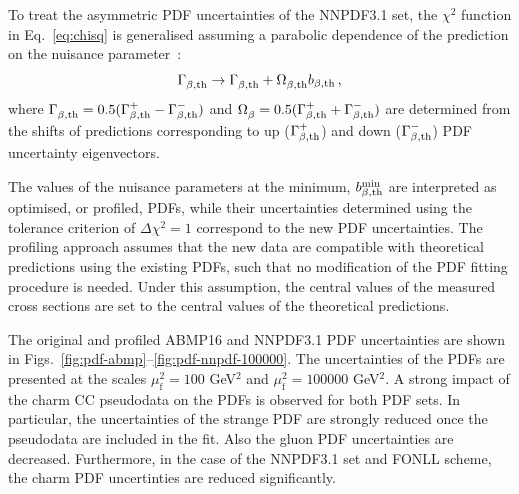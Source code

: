 \documentclass[pdftex,twocolumn,epjc3]{svjour3}          %
\newcommand{\abmp} {ABMP16\xspace}
\newcommand{\nnpdf} {NNPDF3.1\xspace}
\newcommand{\chisq}{\ensuremath{\chi^2}\xspace}
\begin{document}
To treat the asymmetric PDF uncertainties of the \nnpdf set, the \chisq function in Eq.~\ref{eq:chisq} is generalised assuming a parabolic dependence of the prediction on the nuisance parameter~\cite{Alekhin:2014irh}:
\begin{eqnarray}
\Gamma^{}_{\beta, \rm th} \to \Gamma^{}_{\beta, \rm th} +  \Omega^{}_{\beta, \rm th}b_{\beta, \rm th}\,, \label{eq:iter}
\end{eqnarray}
where $\Gamma^{}_{\beta, \rm th} = 0.5(\Gamma^{+}_{\beta, \rm th} - \Gamma^{-}_{\beta, \rm th})$ and $\Omega^{}_{\beta} = 0.5(\Gamma^{+}_{\beta, \rm th}
+ \Gamma^{-}_{\beta, \rm th})$ are determined from the shifts of predictions corresponding to up ($\Gamma^{+}_{\beta, \rm th}$) and down ($ \Gamma^{-}_{\beta, \rm th}$) PDF uncertainty eigenvectors.

The values of the nuisance parameters at the minimum, $b^{\rm min}_{\beta,\rm th}$ are interpreted as optimised, or profiled, PDFs, while their uncertainties determined using the tolerance criterion of $\Delta\chi^2 = 1$ correspond to the new PDF uncertainties. The profiling approach assumes that the new data are compatible with theoretical predictions using the existing PDFs, such that no modification of the PDF fitting procedure is needed. Under this assumption, the central values of the measured cross sections are set to the central values of the theoretical predictions. 

The original and profiled \abmp and \nnpdf PDF uncertainties are shown in Figs.~\ref{fig:pdf-abmp}--\ref{fig:pdf-nnpdf-100000}. 
The uncertainties of the PDFs are presented at the scales $\mu_\mathrm{f}^2=100$ GeV$^2$ and $\mu_\mathrm{f}^2=100000$ GeV$^2$.
A strong impact of the charm CC pseudodata on the PDFs is observed for both PDF sets.
In particular, the uncertainties of the strange PDF are strongly reduced once the pseudodata are included in the fit. 
Also the gluon PDF uncertainties are decreased. Furthermore, in the case of the NNPDF3.1 set and FONLL scheme, the charm PDF uncertinties are reduced significantly.
\end{document}
